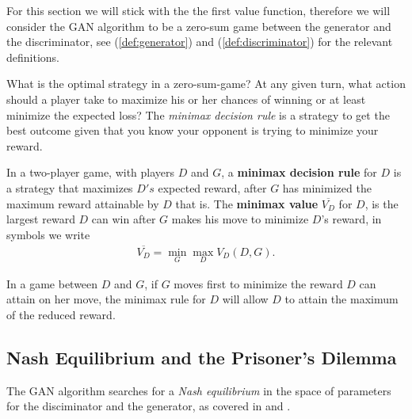 \begin{remark} For this section we will stick with the the first value
  function, therefore we will consider the GAN algorithm to be a
  zero-sum game between the generator and the discriminator, see
  (\ref{def:generator}) and (\ref{def:discriminator}) for the relevant
  definitions.
\end{remark}

What is the optimal strategy in a zero-sum-game? At any given turn,
what action should a player take to maximize his or her chances of
winning or at least minimize the expected loss? The \textit{minimax
  decision rule} is a strategy to get the best outcome given that you
know your opponent is trying to minimize your reward.

\begin{definition}
  \label{def:minimax}
  \label{def:minimax-value} In a two-player game, with players $D$ and
  $G$, a \textbf{minimax decision rule} for $D$ is a strategy that
  maximizes $D's$ expected reward, after $G$ has minimized the maximum
  reward attainable by $D$ that is. The \textbf{minimax value}
  $\overline{V_D}$ for $D$, is the largest reward $D$ can win after
  $G$ makes his move to minimize $D$'s reward, in symbols we write
  \begin{align} \overline{V_D} = \min_{G} \max_{D} V_D(D, {G}).
  \end{align}
\end{definition}

In a game between $D$ and $G$, if $G$ moves first to minimize the
reward $D$ can attain on her move, the minimax rule for $D$ will allow
$D$ to attain the maximum of the reduced reward.

\subsection{Nash Equilibrium and the Prisoner's Dilemma}
\label{sec:nash-dilemma}

The GAN algorithm searches for a \textit{Nash equilibrium} in the
space of parameters for the disciminator and the generator, as covered
in \cite{ref:goodfellow-2016} and \cite{ref:goodfellow-2017}.

